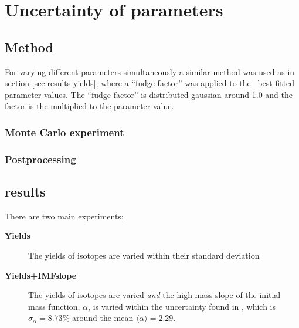 \section{Uncertainty of parameters}

\subsection{Method}
For varying different parameters simultaneously a similar method was used as in section \ref{sec:results-yields}, where a ``fudge-factor'' was applied to the \eris\ best fitted parameter-values. The ``fudge-factor'' is distributed gaussian around 1.0 and the factor is the multiplied to the parameter-value.


\subsubsection{Monte Carlo experiment}

\subsubsection{Postprocessing}


\FloatBarrier

\subsection{results}
\newcommand\expone{\textbf{Yields}}
\newcommand\exptwo{\textbf{Yields+IMFslope}}
There are two main experiments;
\begin{description}
\item[\expone] The yields of isotopes are varied within their standard deviation 
\item[\exptwo] The yields of isotopes are varied \textit{and} the high mass slope of the initial mass function, $\alpha$, is varied within the uncertainty found in , which is $\sigma_{\alpha}=8.73\%$ around the mean $\langle \alpha \rangle = 2.29$.
\end{description}


